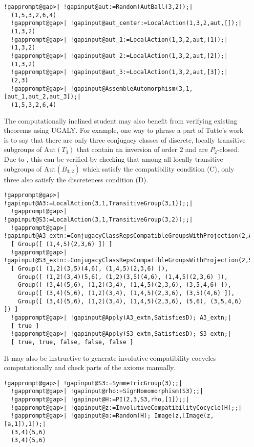 \documentclass[a4paper,11pt]{report}
\begin{document}
{{ 
\begin{Verbatim}[commandchars=!@|,fontsize=\small,frame=single,label=Example]
  !gapprompt@gap>| !gapinput@aut:=Random(AutBall(3,2));|
  (1,5,3,2,6,4)
  !gapprompt@gap>| !gapinput@aut_center:=LocalAction(1,3,2,aut,[]);|
  (1,3,2)
  !gapprompt@gap>| !gapinput@aut_1:=LocalAction(1,3,2,aut,[1]);|
  (1,3,2)
  !gapprompt@gap>| !gapinput@aut_2:=LocalAction(1,3,2,aut,[2]);|
  (1,3,2)
  !gapprompt@gap>| !gapinput@aut_3:=LocalAction(1,3,2,aut,[3]);|
  (2,3)
  !gapprompt@gap>| !gapinput@AssembleAutomorphism(3,1,[aut_1,aut_2,aut_3]);|
  (1,5,3,2,6,4)
\end{Verbatim}
 The computationally inclined student may also benefit from verifying existing
theorems using \textsf{UGALY}. For example, one way to phrase a part of Tutte's work \cite{Tut47} \cite{Tut59} is to say that there are only three conjugacy classes of discrete, locally
transitive subgroups of $\mathrm{Aut}(T_{3})$ that contain an inversion of order $2$ and are $P_{2}$-closed. Due to \cite[Corollary 4.38]{Tor20}, this can be verified by checking that among all locally transitive subgroups
of $\mathrm{Aut}(B_{3,2})$ which satisfy the compatibility condition (C), only three also satisfy the
discreteness condition (D). 

 
\begin{Verbatim}[commandchars=!@|,fontsize=\small,frame=single,label=Example]
  !gapprompt@gap>| !gapinput@A3:=LocalAction(3,1,TransitiveGroup(3,1));;|
  !gapprompt@gap>| !gapinput@S3:=LocalAction(3,1,TransitiveGroup(3,2));;|
  !gapprompt@gap>| !gapinput@A3_extn:=ConjugacyClassRepsCompatibleGroupsWithProjection(2,A3);|
  [ Group([ (1,4,5)(2,3,6) ]) ]
  !gapprompt@gap>| !gapinput@S3_extn:=ConjugacyClassRepsCompatibleGroupsWithProjection(2,S3);|
  [ Group([ (1,2)(3,5)(4,6), (1,4,5)(2,3,6) ]), 
    Group([ (1,2)(3,4)(5,6), (1,2)(3,5)(4,6), (1,4,5)(2,3,6) ]), 
    Group([ (3,4)(5,6), (1,2)(3,4), (1,4,5)(2,3,6), (3,5,4,6) ]), 
    Group([ (3,4)(5,6), (1,2)(3,4), (1,4,5)(2,3,6), (3,5)(4,6) ]), 
    Group([ (3,4)(5,6), (1,2)(3,4), (1,4,5)(2,3,6), (5,6), (3,5,4,6) ]) ]
  !gapprompt@gap>| !gapinput@Apply(A3_extn,SatisfiesD); A3_extn;|
  [ true ]
  !gapprompt@gap>| !gapinput@Apply(S3_extn,SatisfiesD); S3_extn;|
  [ true, true, false, false, false ]
\end{Verbatim}
 It may also be instructive to generate involutive compatibility cocycles
computationally and check parts of the axioms manually. 

 
\begin{Verbatim}[commandchars=!@|,fontsize=\small,frame=single,label=Example]
  !gapprompt@gap>| !gapinput@S3:=SymmetricGroup(3);;|
  !gapprompt@gap>| !gapinput@rho:=SignHomomorphism(S3);;|
  !gapprompt@gap>| !gapinput@H:=PI(2,3,S3,rho,[1]);;|
  !gapprompt@gap>| !gapinput@z:=InvolutiveCompatibilityCocycle(H);;|
  !gapprompt@gap>| !gapinput@a:=Random(H); Image(z,[Image(z,[a,1]),1]);|
  (3,4)(5,6)
  (3,4)(5,6)
\end{Verbatim}
 }

 }
\end{document}

